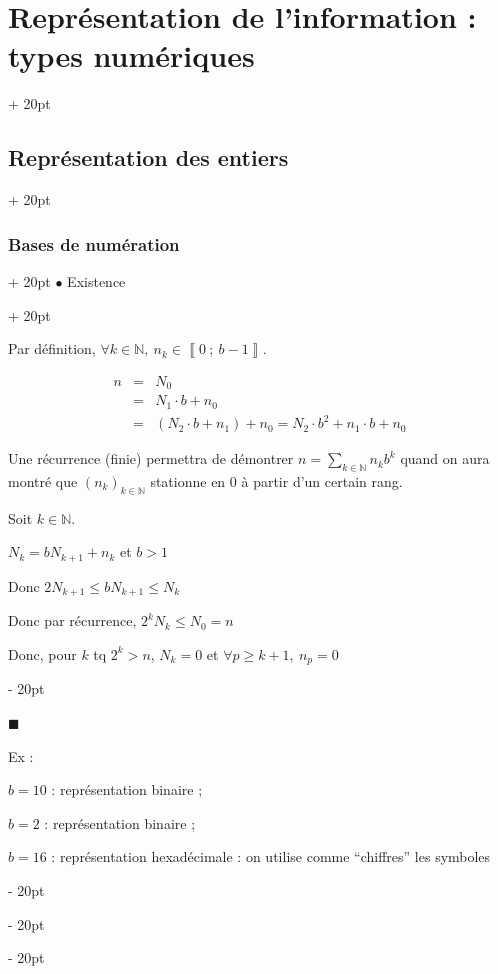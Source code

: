 \documentclass[a4paper, 12pt, twoside]{article}
\newcommand{\N}{\mathbb{N}} %
\newcommand{\nset}[2]{\left\llbracket #1\ ;\ #2 \right\rrbracket}
\newcommand{\ind}[1][20pt]{\advance\leftskip + #1}
\newcommand{\deind}[1][20pt]{\advance\leftskip - #1}
\newenvironment{indentedenv}[1][20pt]{\par \ind[#1]}{\par \deind}
\newenvironment{indt}[2][20pt]{#2 \begin{indentedenv}[#1]}{\end{indentedenv}} %
\begin{document}
\begin{indt}{\section{Représentation de l'information : types numériques}}
\begin{indt}{\subsection{Représentation des entiers}}
\begin{indt}{\subsubsection{Bases de numération}}
\begin{indt}{$\bullet$ Existence}
                    \vspace{6pt}
                    
                    Par définition, $\forall k \in \N, \ n_k \in \nset{0}{b - 1}$.
                    
                    \vspace{-24pt}
                    
                    \begin{eqnarray*}
                        n &=& N_0
                        \\
                        &=& N_1 \cdot b + n_0
                        \\
                        &=& (N_2 \cdot b + n_1) + n_0 = N_2 \cdot b^2 + n_1 \cdot b + n_0
                    \end{eqnarray*}
                    
                    Une récurrence (finie) permettra de démontrer $\displaystyle n = \sum_{k \in \N} n_k b^k$ quand on aura montré que $(n_k)_{k \in \N}$ stationne en 0 à partir d'un certain rang.
                    
                    \vspace{12pt}
                    
                    Soit $k \in \N$.
                    
                    $N_k = b N_{k + 1} + n_k$ et $b > 1$
                    
                    Donc $2 N_{k + 1} \le b N_{k + 1} \le N_k$
                    
                    Donc par récurrence, $2^k N_k \le N_0 = n$
                    
                    Donc, pour $k$ tq $2^k > n$, $N_k = 0$ et $\forall p \ge k + 1,\ n_p = 0$
                \end{indt}
                
                $\blacksquare$
                
                \vspace{12pt}
                
                Ex :
                
                $b = 10$ : représentation binaire ;
                
                $b = 2$ : représentation binaire ;
                
                $b = 16$ : représentation hexadécimale : on utilise comme ``chiffres'' les symboles
                

\end{indt}
\end{indt}
\end{indt}
\end{document}
